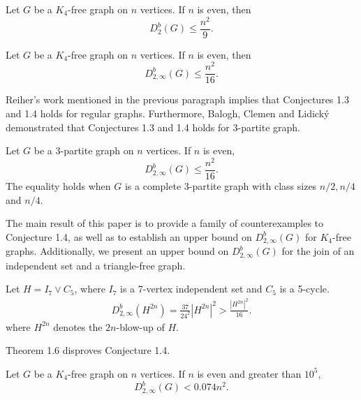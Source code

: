 \documentclass[11pt, oneside]{article}   	%
\begin{document}
\begin{Conj}
    Let $G$ be a $K_4$-free graph on $n$ vertices. If $n$ is even, then
    $$D_2^b(G)\leq \frac{n^2}{9}.$$
\end{Conj}

\begin{Conj}
    Let $G$ be a $K_4$-free graph on $n$ vertices. If $n$ is even, then
    $$D_{2,\infty}^b(G)\leq \frac{n^2}{16}.$$
\end{Conj}

Reiher's work\cite{reiher2022} mentioned in the previous paragraph implies that Conjectures 1.3 and 1.4 holds for regular graphs. Furthermore, Balogh, Clemen and Lidický\cite{balogh2023} demonstrated that Conjectures 1.3 and 1.4 holds for 3-partite graph.
\begin{Th}
Let $G$ be a 3-partite graph on $n$ vertices. If $n$ is even,
        $$D_{2,\infty}^b(G)\leq \frac{n^2}{16}.$$
The equality holds when $G$ is a complete 3-partite graph with class sizes $n/2,n/4$ and $n/4$.
\end{Th}

The main result of this paper is to provide a family of counterexamples to Conjecture 1.4, as well as to establish an upper bound on $D_{2,\infty}^b(G)$ for $K_4$-free graphs. Additionally, we present an upper bound on $D_{2,\infty}^b(G)$ for the join of an independent set and a triangle-free graph.


\begin{Th}
Let $H=I_7\vee C_5$, where $I_7$ is a 7-vertex independent set and $C_5$ is a 5-cycle.
    \begin{equation}
        \begin{aligned}
            D_{2,\infty}^b(H^{2n})=\frac{37}{24^2}|H^{2n}|^2>\frac{|H^{2n}|^2}{16}.
        \end{aligned}
    \end{equation} 
    where $H^{2n}$ denotes the $2n$-blow-up of $H$.
\end{Th} 

\begin{remark}
    Theorem 1.6 disproves Conjecture 1.4.
\end{remark}
\begin{Th}
Let $G$ be a $K_4$-free graph on $n$ vertices. If $n$ is even and greater than $10^5$,
    \begin{equation}
        D_{2,\infty}^b(G)< 0.074n^2.
    \end{equation}
\end{Th}
\end{document}
